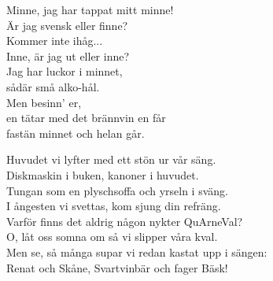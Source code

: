 \documentclass[a6paper, 10pt, twoside]{article}
\begin{document}
\vspace{10pt}
\begin{center}
\end{center}
\begin{lyrics}
Minne, jag har tappat mitt minne! \\
Är jag svensk eller finne?\\
Kommer inte ihåg...
\vspace{5pt}\\
Inne, är jag ut eller inne?\\
Jag har luckor i minnet,\\
sådär små alko-hål.\\
Men besinn' er,\\
en tätar med det brännvin en får\\
fastän minnet och helan går. 
\end{lyrics}
\vspace{10pt}
\begin{center}
\end{center}
\begin{lyrics}
Huvudet vi lyfter med ett stön ur vår säng.\\
Diskmaskin i buken, kanoner i huvudet.\\
Tungan som en plyschsoffa och yrseln i sväng.\\
I ångesten vi svettas, kom sjung din refräng.
\vspace{5pt}\\
Varför finns det aldrig någon nykter QuArneVal?\\
O, låt oss somna om så vi slipper våra kval.\\
Men se, så många supar vi redan kastat upp i sängen:\\
Renat och Skåne, Svartvinbär och fager Bäsk! 
\end{lyrics}
\end{document}
